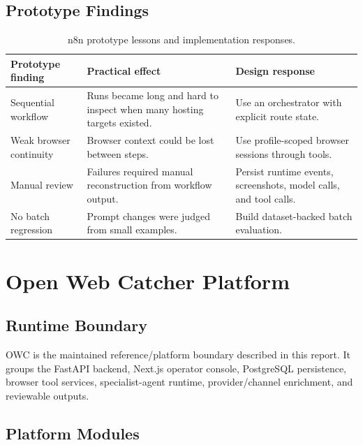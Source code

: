 \subsection{Prototype Findings}

\begin{table}[!htbp]
\centering
\begin{tabularx}{\textwidth}{Q{3.1cm} Y Y}
\toprule
{}
Prototype finding & Practical effect & Design response \\
\midrule
Sequential workflow & Runs became long and hard to inspect when many hosting
targets existed. & Use an orchestrator with explicit route state. \\
Weak browser continuity & Browser context could be lost between steps. & Use
profile-scoped browser sessions through tools. \\
Manual review & Failures required manual reconstruction from workflow output. &
Persist runtime events, screenshots, model calls, and tool calls. \\
No batch regression & Prompt changes were judged from small examples. & Build
dataset-backed batch evaluation. \\
\bottomrule
\end{tabularx}
\caption{n8n prototype lessons and implementation responses.}
\label{tab:n8n-agent-lessons}
\end{table}



\section{Open Web Catcher Platform}

\subsection{Runtime Boundary}

OWC is the maintained reference/platform boundary described in this report. It
groups the FastAPI backend, Next.js operator console, PostgreSQL persistence,
browser tool services, specialist-agent runtime, provider/channel enrichment,
and reviewable outputs.

\subsection{Platform Modules}

